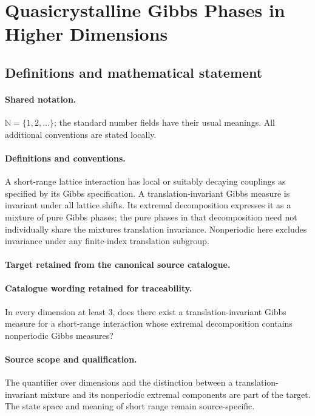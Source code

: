 \documentclass[11pt]{article}
\begin{document}
\section{Quasicrystalline Gibbs Phases in Higher Dimensions}\label{statement}

\subsection{Definitions and mathematical statement}

\paragraph{Shared notation.}$\mathbb N=\{1,2,\ldots\}$; the standard number fields have their usual meanings. All additional conventions are stated locally.


\paragraph{Definitions and conventions.}
A short-range lattice interaction has local or suitably decaying couplings as specified by its Gibbs specification. A translation-invariant Gibbs measure is invariant under all lattice shifts. Its extremal decomposition expresses it as a mixture of pure Gibbs phases; the pure phases in that decomposition need not individually share the mixture\textquotesingle s translation invariance. Nonperiodic here excludes invariance under any finite-index translation subgroup.

\paragraph{Target retained from the canonical source catalogue.}
\paragraph{Catalogue wording retained for traceability.}
In every dimension at least $3$, does there exist a translation-invariant Gibbs measure for a short-range interaction whose extremal decomposition contains nonperiodic Gibbs measures?

\paragraph{Source scope and qualification.}
The quantifier over dimensions and the distinction between a translation-invariant mixture and its nonperiodic extremal components are part of the target. The state space and meaning of short range remain source-specific.
\end{document}
